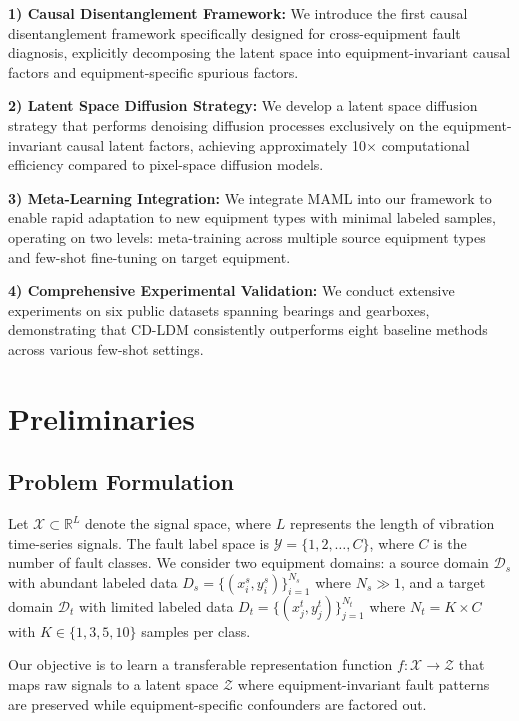 \documentclass[lettersize,journal]{IEEEtran}
\begin{document}
\textbf{1) Causal Disentanglement Framework:} We introduce the first causal disentanglement framework specifically designed for cross-equipment fault diagnosis, explicitly decomposing the latent space into equipment-invariant causal factors and equipment-specific spurious factors.

\textbf{2) Latent Space Diffusion Strategy:} We develop a latent space diffusion strategy that performs denoising diffusion processes exclusively on the equipment-invariant causal latent factors, achieving approximately 10$\times$ computational efficiency compared to pixel-space diffusion models.

\textbf{3) Meta-Learning Integration:} We integrate MAML into our framework to enable rapid adaptation to new equipment types with minimal labeled samples, operating on two levels: meta-training across multiple source equipment types and few-shot fine-tuning on target equipment.

\textbf{4) Comprehensive Experimental Validation:} We conduct extensive experiments on six public datasets spanning bearings and gearboxes, demonstrating that CD-LDM consistently outperforms eight baseline methods across various few-shot settings.

\section{Preliminaries}

\subsection{Problem Formulation}

Let $\mathcal{X} \subset \mathbb{R}^{L}$ denote the signal space, where $L$ represents the length of vibration time-series signals. The fault label space is $\mathcal{Y} = \{1, 2, \ldots, C\}$, where $C$ is the number of fault classes. We consider two equipment domains: a source domain $\mathcal{D}_s$ with abundant labeled data $D_s = \{(x_i^s, y_i^s)\}_{i=1}^{N_s}$ where $N_s \gg 1$, and a target domain $\mathcal{D}_t$ with limited labeled data $D_t = \{(x_j^t, y_j^t)\}_{j=1}^{N_t}$ where $N_t = K \times C$ with $K \in \{1, 3, 5, 10\}$ samples per class.

Our objective is to learn a transferable representation function $f: \mathcal{X} \rightarrow \mathcal{Z}$ that maps raw signals to a latent space $\mathcal{Z}$ where equipment-invariant fault patterns are preserved while equipment-specific confounders are factored out.
\end{document}
